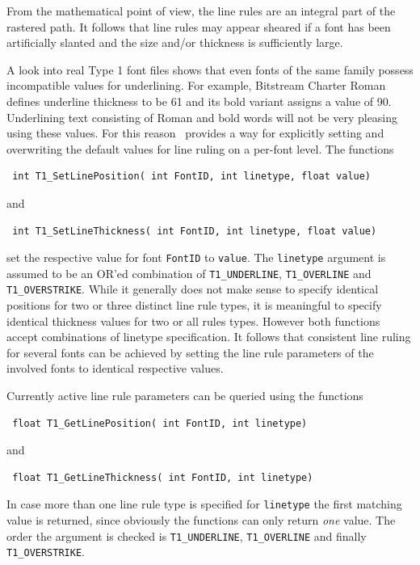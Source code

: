 From the mathematical point of view, the line rules are an integral part of
the rastered path. It follows that line rules may appear sheared if a font has
been artificially slanted and the size and/or thickness is sufficiently large.

A look into real Type 1 font files shows that even fonts of the same family
possess incompatible values for underlining. For example, Bitstream Charter
Roman defines underline thickness to be 61 and its bold variant assigns a
value of 90. Underlining text consisting of Roman and bold words will not be
very pleasing using these values. For this reason \tonelib\ provides a way for
explicitly setting and overwriting the default values for line ruling on a
per-font level. The functions 
\precorr
\begin{verbatim}
 int T1_SetLinePosition( int FontID, int linetype, float value)
\end{verbatim}\postcorr
and
\precorr
\begin{verbatim}
 int T1_SetLineThickness( int FontID, int linetype, float value)
\end{verbatim}\postcorr
set the respective value for font \verb+FontID+ to \verb+value+.
The \verb+linetype+ argument is assumed to be an OR'ed combination of
\verb+T1_UNDERLINE+, \verb+T1_OVERLINE+ and \verb+T1_OVERSTRIKE+. While it
generally does not make sense to specify identical positions for two or three
distinct line rule types, it is meaningful to specify identical thickness
values for two or all rules types. However both functions accept combinations
of linetype specification.
It follows that consistent line ruling for several fonts can be achieved by
setting the line rule parameters of the involved fonts to identical respective
values.

Currently active line rule parameters can be queried using the functions
\precorr
\begin{verbatim}
 float T1_GetLinePosition( int FontID, int linetype)
\end{verbatim}\postcorr
and
\precorr
\begin{verbatim}
 float T1_GetLineThickness( int FontID, int linetype)
\end{verbatim}\postcorr
In case more than one line rule type is specified for
\verb+linetype+ the first matching value is returned, 
since obviously the functions can only return {\em one} value. The order the
argument is checked is \verb+T1_UNDERLINE+, \verb+T1_OVERLINE+ and
finally \verb+T1_OVERSTRIKE+. 

